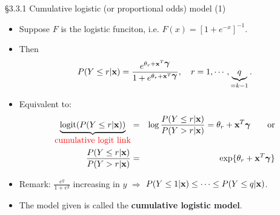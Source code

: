 \documentclass{beamer}
\newenvironment{wideitemize}%
  {\begin{itemize}%
    \setlength{\parskip}{1em}}%
  {\end{itemize}}
\begin{document}
\begin{frame}{\S3.3.1 Cumulative logistic (or proportional odds) model (1)}
\begin{wideitemize}



\item Suppose $F$ is the logistic funciton, i.e.
$
 F(x)=\left[1+e^{-x}\right]^{-1}$.
 
 
 \item Then
\begin{equation}
P(Y\leq r|\textbf{x})=\frac{e^{\theta_r+\textbf{x}^T\mbox{\boldmath $\gamma$}}}{1 
+e^{\theta_r+\textbf{x}^T\mbox{\boldmath $\gamma$}}}, \quad r=1,\cdots, \underbrace{q}_{= k-1}.
\label{eq-3.3.4}
\end{equation}
\item
Equivalent to:
\begin{eqnarray}
\underbrace{\text{logit} ( P(Y\leq r|\textbf{x}))}_{\textcolor{red}{\mbox{cumulative logit link}}} &=& \log\frac{P(Y\leq r|\textbf{x})}{P(Y> r|\textbf{x})} = \theta_r+\textbf{x}^T\mbox{\boldmath $\gamma$}
\quad\quad \mbox{or} \label{eq-3.3.5} \\
\frac{P(Y\leq r|\textbf{x})}{P(Y> r|\textbf{x})} &=& \exp\{\theta_r+\textbf{x}^T\mbox{\boldmath $\gamma$}\}
\label{eq-3.3.6}
\end{eqnarray}

\item Remark: $\frac{e^y}{1 + e^y}$ increasing in $y$ $\Rightarrow$ $P(Y \leq 1 | {\bf x}) \leq \cdots \leq P(Y \leq q | {\bf x})$.

\item The model given 
 is called the \textbf{cumulative
logistic model}.
\end{wideitemize}
\end{frame}
\end{document}
